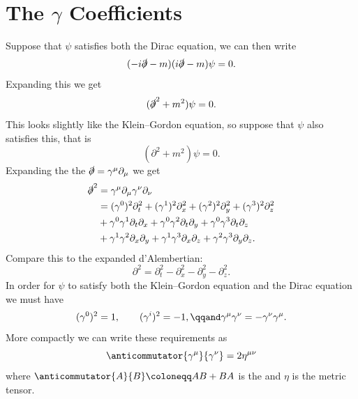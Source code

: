 \documentclass[fleqn]{NotesClass}
\newcommand{\dalembertian}{\partial^2}
\begin{document}
    \section{The \texorpdfstring{\(\gamma\)}{gamma} Coefficients}
    Suppose that \(\psi\) satisfies both the Dirac equation, we can then write
    \begin{equation}
        (-i\slashed{\partial} - m)(i\slashed{\partial} - m)\psi = 0.
    \end{equation}
    Expanding this we get
    \begin{equation}
        (\slashed{\partial}^2 +m^2)\psi = 0.
    \end{equation}
    This looks slightly like the Klein--Gordon equation, so suppose that \(\psi\) also satisfies this, that is
    \begin{equation}
        (\dalembertian + m^2)\psi = 0.
    \end{equation}
    Expanding the the \(\slashed{\partial} = \gamma^\mu \partial_\mu\) we get
    \begin{align}
        \slashed{\partial}^2 &= \gamma^\mu\partial_\mu \gamma^\nu\partial_\nu\\
        &= (\gamma^0)^2\partial_t^2 + (\gamma^1)^2\partial_x^2 + (\gamma^2)^2\partial_y^2 + (\gamma^3)^2\partial_z^2\\
        &+ \gamma^0\gamma^1 \partial_t\partial_x + \gamma^0\gamma^2 \partial_t\partial_y + \gamma^0\gamma^3 \partial_t\partial_z\\
        &+ \gamma^1\gamma^2 \partial_x\partial_y + \gamma^1\gamma^3 \partial_x\partial_z + \gamma^2\gamma^3 \partial_y\partial_z.
    \end{align}
    Compare this to the expanded d'Alembertian:
    \begin{equation}
        \dalembertian = \partial_t^2 - \partial_x^2 - \partial_y^2 - \partial_z^2.
    \end{equation}
    In order for \(\psi\) to satisfy both the Klein--Gordon equation and the Dirac equation we must have
    \begin{equation}
        (\gamma^0)^2 = 1, \qquad (\gamma^i)^2 = -1, \qqand \gamma^\mu \gamma^\nu = -\gamma^\nu \gamma^\mu.
    \end{equation}
    More compactly we can write these requirements as\index{\(\gamma^\mu\)}
    \begin{equation}
        \anticommutator{\gamma^\mu}{\gamma^\nu} = 2\eta^{\mu\nu}
    \end{equation}
    where \(\anticommutator{A}{B} \coloneqq AB + BA\) is the  and \(\eta\) is the metric tensor.
    
\end{document}
